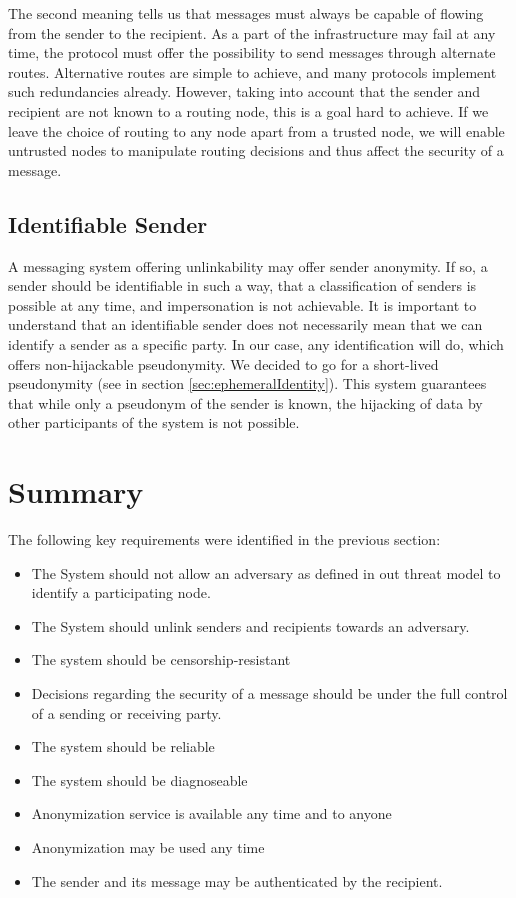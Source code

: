 The second meaning tells us that messages must always be capable of flowing from the sender to the recipient. As a part of the infrastructure may fail at any time, the protocol must offer the possibility to send messages through alternate routes. Alternative routes are simple to achieve, and many protocols implement such redundancies already. However, taking into account that the sender and recipient are not known to a routing node, this is a goal hard to achieve. If we leave the choice of routing to any node apart from a trusted node, we will enable untrusted nodes to manipulate routing decisions and thus affect the security of a message.

\subsection{Identifiable Sender}
A messaging system offering unlinkability may offer sender anonymity. If so, a sender should be identifiable in such a way, that a classification of senders is possible at any time, and impersonation is not achievable. It is important to understand that an identifiable sender does not necessarily mean that we can identify a sender as a specific party. In our case, any identification will do, which offers non-hijackable pseudonymity. We decided to go for a short-lived pseudonymity (see  in section \ref{sec:ephemeralIdentity}). This system guarantees that while only a pseudonym of the sender is known, the hijacking of data by other participants of the system is not possible.

\section{Summary}
The following key requirements were identified in the previous section:
\begin{itemize}
	\item The System should not allow an adversary as defined in out threat model to identify a participating node.
	\item The System should unlink senders and recipients towards an adversary.
	\item The system should be censorship-resistant
	\item Decisions regarding the security of a message should be under the full control of a sending or receiving party.
	\item The system should be reliable
	\item The system should be diagnoseable 
	\item Anonymization service is available any time and to anyone
	\item Anonymization may be used any time
	\item The sender and its message may be authenticated by the recipient.
\end{itemize}

